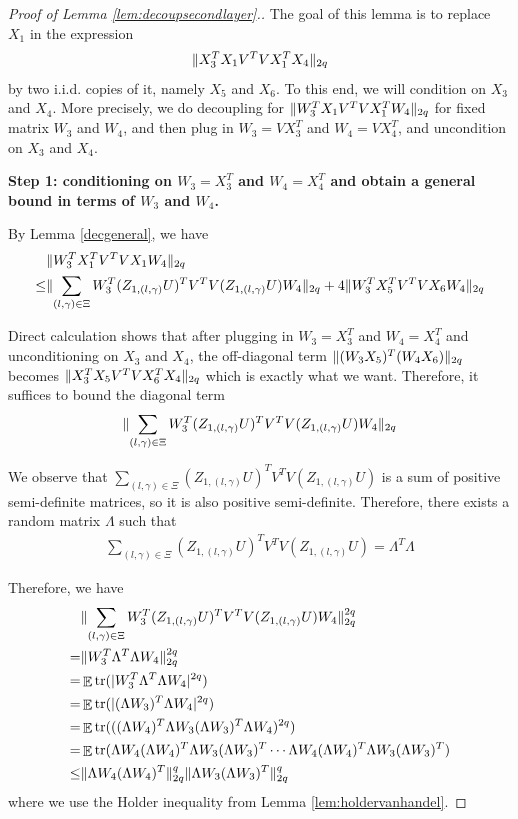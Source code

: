 \documentclass[11pt]{amsart}
\numberwithin{equation}{section}
\numberwithin{equation}{section}
\DeclareMathOperator{\E}{\mathbb{E}}
\DeclareMathOperator*{\tr}{tr}
\DeclarePairedDelimiter{\norm}{\lVert}{\rVert}
\begin{document}
\begin{proof}[Proof of Lemma \ref{lem:decoupsecondlayer}.]


The goal of this lemma is to replace $X_1$ in the expression
\begin{align*}
    \norm{X_3^TX_1V^TVX_1^TX_4}_{2q}
\end{align*}
by two i.i.d. copies of it, namely $X_5$ and $X_6$. To this end, we will condition on $X_3$ and $X_4$. More precisely, we do decoupling for $\norm{W_3^TX_1V^TVX_1^TW_4}_{2q}$ for fixed matrix $W_3$ and $W_4$, and then plug in $W_3=VX_3^T$ and $W_4=VX_4^T$, and uncondition on $X_3$ and $X_4$.

\textbf{Step 1: conditioning on $W_3=X_3^T$ and $W_4=X_4^T$ and obtain a general bound in terms of $W_3$ and $W_4$.}

By Lemma \ref{decgeneral}, we have
\begin{align*}
    &\norm{W_3^TX_1^TV^TVX_1W_4}_{2q}\\ \le &\norm{\sum \limits_{(l,\gamma) \in \Xi}W_3^T(Z_{1,(l,\gamma)}U)^TV^TV(Z_{1,(l,\gamma)}U)W_4}_{2q}+4\norm{W_3^TX_5^TV^TVX_6W_4}_{2q}
\end{align*}

Direct calculation shows that after plugging in $W_3=X_3^T$ and $W_4=X_4^T$ and unconditioning on $X_3$ and $X_4$, the off-diagonal term $\norm{(W_3X_5)^T(W_4X_{6})}_{2q}$ becomes $\norm{X_3^TX_5V^TVX_6^TX_4}_{2q}$ which is exactly what we want. Therefore, it suffices to bound the diagonal term
\begin{align*}
    \norm{\sum \limits_{(l,\gamma) \in \Xi}W_3^T(Z_{1,(l,\gamma)}U)^TV^TV(Z_{1,(l,\gamma)}U)W_4}_{2q}
\end{align*}

We observe that $\sum \limits_{(l,\gamma) \in \Xi}(Z_{1,(l,\gamma)}U)^TV^TV(Z_{1,(l,\gamma)}U)$ is a sum of positive semi-definite matrices, so it is also positive semi-definite. Therefore, there exists a random matrix $\Lambda$ such that
\begin{align*}
    \sum \limits_{(l,\gamma) \in \Xi}(Z_{1,(l,\gamma)}U)^TV^TV(Z_{1,(l,\gamma)}U)=\Lambda^T\Lambda
\end{align*}

Therefore, we have
\begin{align*}
    &\norm{\sum \limits_{(l,\gamma) \in \Xi}W_3^T(Z_{1,(l,\gamma)}U)^TV^TV( Z_{1,(l,\gamma)}U)W_4}_{2q}^{2q}
    \\=&\norm{W_3^T\Lambda^T\Lambda W_4}_{2q}^{2q}
    \\=&\E\tr(|W_3^T\Lambda^T\Lambda W_4|^{2q})
    \\=&\E\tr(|(\Lambda W_3)^T\Lambda W_4|^{2q})
    \\=&\E\tr(((\Lambda W_4)^T\Lambda W_3(\Lambda W_3)^T\Lambda W_4)^{2q})
    \\=&\E\tr(\Lambda W_4(\Lambda W_4)^T\Lambda W_3(\Lambda W_3)^T \cdots \Lambda W_4(\Lambda W_4)^T\Lambda W_3(\Lambda W_3)^T)
    \\ \le & \norm{\Lambda W_4(\Lambda W_4)^T}_{2q}^q\norm{\Lambda W_3(\Lambda W_3)^T}_{2q}^q
\end{align*}
where we use the Holder inequality from Lemma \ref{lem:holdervanhandel}.


\end{proof}
\end{document}
